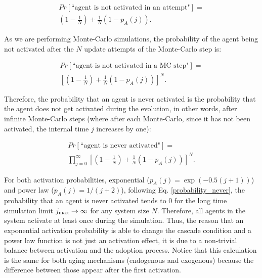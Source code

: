 \begin{align}
    Pr[\textrm{``agent is not activated in an attempt"}] = \nonumber \\
    \left(1 - \frac{1}{N}\right) + \frac{1}{N} (1 - p_{A}(j)).
\end{align}

As we are performing Monte-Carlo simulations, the probability of the agent being not activated after the $N$ update attempts of the Monte-Carlo step is:

\begin{align}
    Pr[\textrm{``agent is not activated in a MC step"}] = \nonumber \\
    \left[ \left(1 - \frac{1}{N}\right) + \frac{1}{N} (1 - p_{A}(j)) \right]^N.
\end{align}

Therefore, the probability that an agent is never activated is the probability that the agent does not get activated during the evolution, in other words, after infinite Monte-Carlo steps (where after each Monte-Carlo, since it has not been activated, the internal time $j$ increases by one):

\begin{align} \label{probability_never}
    Pr[\textrm{``agent is never activated"}] = \nonumber \\
    \prod_{j=0}^{\infty} \left[ \left(1 - \frac{1}{N}\right) + \frac{1}{N} (1 - p_{A}(j)) \right]^N.
\end{align}

For both activation probabilities, exponential ($p_A(j) = \exp{(-0.5(j+1))}$) and power law ($p_A(j) = 1/(j+2)$), following Eq. \eqref{probability_never}, the probability that an agent is never activated tends to $0$ for the long time simulation limit $j_{\rm max} \to \infty$ for any system size $N$. Therefore, all agents in the system activate at least once during the simulation. Thus, the reason that an exponential activation probability is able to change the cascade condition and a power law function is not just an activation effect, it is due to a non-trivial balance between activation and the adoption process. Notice that this calculation is the same for both aging mechanisms (endogenous and exogenous) because the difference between those appear after the first activation.